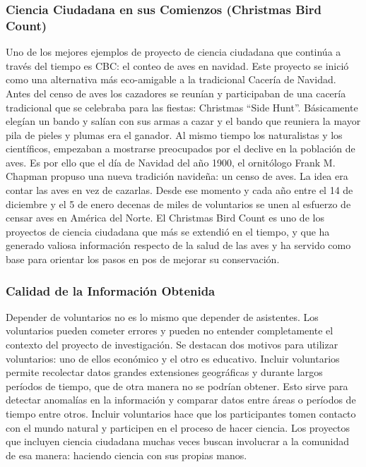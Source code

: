 \subsubsection{Ciencia Ciudadana en sus Comienzos (Christmas Bird Count)}
	Uno de los mejores ejemplos de proyecto de ciencia ciudadana que continúa a través del tiempo es CBC: el conteo de aves en navidad. Este proyecto se inició como una alternativa más eco-amigable a la tradicional Cacería de Navidad.  Antes del censo de aves los cazadores se reunían y participaban de una cacería tradicional que se celebraba para las fiestas: Christmas ``Side Hunt''. Básicamente elegían un bando y salían con sus armas a cazar y el bando que reuniera la mayor pila de pieles y plumas era el ganador. Al mismo tiempo los naturalistas y los científicos, empezaban a mostrarse preocupados por el declive en la población de aves. Es por ello que el día de Navidad del año 1900, el ornitólogo Frank M. Chapman propuso una nueva tradición navideña: un censo de aves. La idea era contar las aves en vez de cazarlas. Desde ese momento y cada año entre el 14 de diciembre y el 5 de enero decenas de miles de voluntarios se unen al esfuerzo de censar aves en América del Norte. El Christmas Bird Count es uno de los proyectos de ciencia ciudadana que más se extendió en el tiempo, y que ha generado valiosa información respecto de la salud de las aves y ha servido como base para orientar los pasos en pos de mejorar su conservación.  \cite{CBC}
	
\subsubsection{Calidad de la Información Obtenida}	

Depender de voluntarios no es lo mismo que depender de asistentes. Los voluntarios pueden cometer errores y pueden no entender completamente el contexto del proyecto de investigación. Se destacan dos motivos para utilizar voluntarios: uno de ellos económico y el otro es educativo. Incluir voluntarios permite recolectar datos grandes extensiones geográficas y durante largos períodos de tiempo, que de otra manera no se podrían obtener. Esto sirve para detectar anomalías en la información y comparar datos entre áreas o períodos de tiempo entre otros. Incluir voluntarios hace que los participantes tomen contacto con el mundo natural y participen en el proceso de hacer ciencia. Los proyectos que incluyen ciencia ciudadana muchas veces buscan involucrar a la comunidad de esa manera: haciendo ciencia con sus propias manos.

